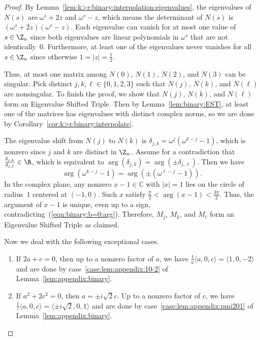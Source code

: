 \documentclass[11pt]{article}
\begin{document}
\begin{proof}
 By Lemma~\ref{lem:k>r:binary:interpolation:eigenvalues},
 the eigenvalues of $N(s)$ are $\omega^s + 2 z$ and $\omega^s - z$,
 which means the determinant of $N(s)$ is $(\omega^s + 2 z) (\omega^s - z)$.
 Each eigenvalue can vanish for at most one value of $s \in \Z_n$ since both eigenvalues are linear polynomials in $\omega^s$ that are not identically~$0$.
 Furthermore, at least one of the eigenvalues never vanishes for all $s \in \Z_n$ since otherwise $1 = |z| = \frac{1}{2}$.
 
 Thus, at most one matrix among $N(0)$, $N(1)$, $N(2)$, and $N(3)$ can be singular.
 Pick distinct $j, k, \ell \in \{0,1,2,3\}$ such that $N(j)$, $N(k)$, and $N(\ell)$ are nonsingular.
 To finish the proof,
 we show that $N(j)$, $N(k)$, and $N(\ell)$ form an Eigenvalue Shifted Triple.
 Then by Lemma~\ref{lem:binary:EST},
 at least one of the matrices has eigenvalues with distinct complex norms,
 so we are done by Corollary~\ref{cor:k>r:binary:interpolate}.
 
 The eigenvalue shift from $N(j)$ to $N(k)$ is $\delta_{j,k} = \omega^j (\omega^{k-j} - 1)$,
 which is nonzero since $j$ and $k$ are distinct in $\Z_n$.
 Assume for a contradiction that $\frac{\delta_{j,k}}{\delta_{j,\ell}} \in \R$,
 which is equivalent to $\arg(\delta_{j,k}) = \arg(\pm \delta_{j,\ell})$.
 Then we have
 \begin{equation}
  \arg\left(\omega^{k-j} - 1\right) = \arg\left(\pm (\omega^{\ell-j} - 1)\right). \label{eqn:binary:b=0:arg}
 \end{equation}
 In the complex plane,
 any nonzero $x - 1 \in \mathbb{C}$ with $|x| = 1$ lies on the circle of radius~$1$ centered at $(-1,0)$.
 Such $x$ satisfy $\frac{\pi}{2} < \arg(x - 1) < \frac{3 \pi}{2}$.
 Thus, the argument of $x - 1$ is unique, even up to a sign, contradicting~(\ref{eqn:binary:b=0:arg}).
 Therefore, $M_j$, $M_k$, and $M_\ell$ form an Eigenvalue Shifted Triple as claimed.
 
 Now we deal with the following exceptional cases.
 \begin{enumerate}
  \item If $2 a + c = 0$,
  then up to a nonzero factor of $a$,
  we have $\frac{1}{a} \langle a,0,c \rangle = \langle 1, 0, -2 \rangle$
  and are done by case~\ref{case:lem:appendix:10-2} of Lemma~\ref{lem:appendix:binary}.
  
  \item If $a^2 + 2 c^2 = 0$,
  then $a = \pm i \sqrt{2} c$.
  Up to a nonzero factor of $c$,
  we have $\frac{1}{c} \langle a,0,c \rangle = \langle \pm i \sqrt{2}, 0, 1 \rangle$
  and are done by case~\ref{case:lem:appendix:pmi201} of Lemma~\ref{lem:appendix:binary}.
  

\end{enumerate}
\end{proof}
\end{document}
